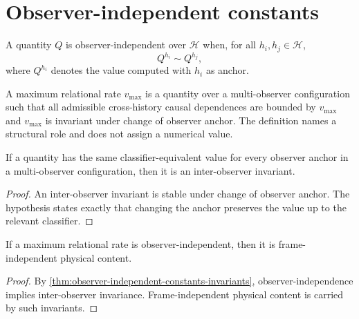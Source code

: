 \section{Observer-independent constants}
\label{sec:observer-independent-constants}

\begin{definition}
\label{def:observer-independent-quantity}
A quantity $Q$ is observer-independent over $\mathcal H$ when, for all $h_i,h_j\in\mathcal H$,
$$
Q^{h_i}\sim Q^{h_j},
$$
where $Q^{h_i}$ denotes the value computed with $h_i$ as anchor.
\end{definition}

\begin{definition}
\label{def:maximum-relational-rate}
A maximum relational rate $v_{\max}$ is a quantity over a multi-observer configuration such that all admissible cross-history causal dependences are bounded by $v_{\max}$ and $v_{\max}$ is invariant under change of observer anchor. The definition names a structural role and does not assign a numerical value.
\end{definition}

\begin{theorem}
\label{thm:observer-independent-constants-invariants}
If a quantity has the same classifier-equivalent value for every observer anchor in a multi-observer configuration, then it is an inter-observer invariant.
\end{theorem}

\begin{proof}
An inter-observer invariant is stable under change of observer anchor. The hypothesis states exactly that changing the anchor preserves the value up to the relevant classifier.
\end{proof}

\begin{corollary}
\label{cor:invariant-maximum-rate-frame-independent}
If a maximum relational rate is observer-independent, then it is frame-independent physical content.
\end{corollary}

\begin{proof}
By \autoref{thm:observer-independent-constants-invariants}, observer-independence implies inter-observer invariance. Frame-independent physical content is carried by such invariants.
\end{proof}

